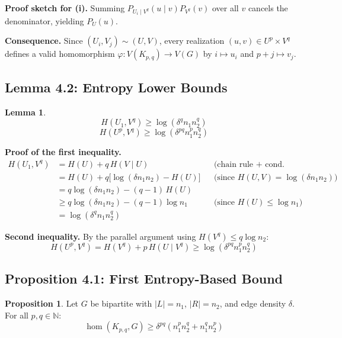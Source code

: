 \documentclass[12pt,a4paper]{article}
\theoremstyle{definition}
\newtheorem{lemma}[theorem]{Lemma}
\newtheorem{proposition}[theorem]{Proposition}
\newcommand{\hom}{\operatorname{hom}}
\begin{document}
\textbf{Proof sketch for (i).} Summing $P_{U_i \mid V^q}(u \mid v)P_{V^q}(v)$ over all $v$ cancels the
denominator, yielding $P_U(u)$.

\textbf{Consequence.} Since $(U_i, V_j) \sim (U,V)$, every realization $(u,v) \in U^p \times V^q$ defines
a valid homomorphism $\varphi: V(K_{p,q}) \to V(G)$ by $i \mapsto u_i$ and $p+j \mapsto v_j$.

\subsection{Lemma 4.2: Entropy Lower Bounds}

\begin{lemma}
  \[H(U_1, V^q) \geq \log(\delta^q n_1 n_2^q)\]
  \[H(U^p, V^q) \geq \log(\delta^{pq} n_1^p n_2^q)\]
\end{lemma}

\textbf{Proof of the first inequality.}
\begin{align*}
  H(U_1, V^q)
    &= H(U) + q\,H(V \mid U)                     &&\text{(chain rule + cond.\ independence)} \\
    &= H(U) + q\bigl[\log(\delta n_1 n_2) - H(U)\bigr] &&\text{(since $H(U,V)=\log(\delta n_1 n_2)$)} \\
    &= q\log(\delta n_1 n_2) - (q-1)\,H(U) \\
    &\geq q\log(\delta n_1 n_2) - (q-1)\log n_1 &&\text{(since $H(U) \leq \log n_1$)} \\
    &= \log(\delta^q n_1 n_2^q)
\end{align*}

\textbf{Second inequality.} By the parallel argument using $H(V^q) \leq q\log n_2$:
\[
  H(U^p, V^q) = H(V^q) + p\,H(U \mid V^q) \geq \log(\delta^{pq} n_1^p n_2^q)
\]

\subsection{Proposition 4.1: First Entropy-Based Bound}

\begin{proposition}
  Let $G$ be bipartite with $|L|=n_1$, $|R|=n_2$, and edge density $\delta$. For all $p,q \in \mathbb{N}$:
  \[
    \hom(K_{p,q}, G) \geq \delta^{pq}(n_1^p n_2^q + n_1^q n_2^p)
  \]
\end{proposition}
\end{document}
